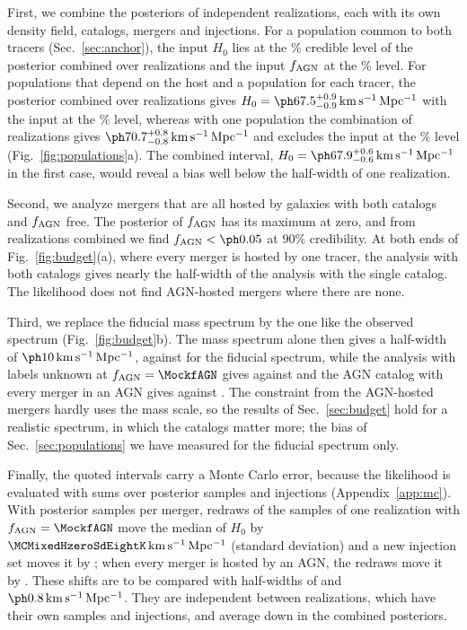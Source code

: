 \documentclass[aps,prd,reprint,amsmath,amssymb,nofootinbib]{revtex4-2}
\newcommand{\kmsMpc}{\,{\rm km\,s^{-1}\,Mpc^{-1}}}
\newcommand{\fAGN}{f_{\rm AGN}}
\begin{document}
First, we combine the posteriors of independent realizations, each with its own density field, catalogs, mergers and injections.
For a population common to both tracers (Sec.~\ref{sec:anchor}), the input $H_0$ lies at the \IndRecHzeroCL\% credible level of the posterior combined over \NrealKnown{} realizations and the input $\fAGN$ at the \IndRecfAGNCL\% level. %
For populations that depend on the host and a population for each tracer, the posterior combined over \NrealHD{} realizations gives $H_0=\IndTwoPopHzeroComb\kmsMpc$ with the input at the \IndTwoPopCL\% level, whereas with one population the combination of \NrealHDSingle{} realizations gives $\IndOnePopHzeroComb\kmsMpc$ and excludes the input at the \IndOnePopCL\% level (Fig.~\ref{fig:populations}a). %
The combined interval, $H_0=\IndRecHzeroComb\kmsMpc$ in the first case, would reveal a bias well below the half-width of one realization. %

Second, we analyze mergers that are all hosted by galaxies with both catalogs and $\fAGN$ free.
The posterior of $\fAGN$ has its maximum at zero, and from \IndNreal{} realizations combined we find $\fAGN<\IndZerofAGNUL$ at 90\% credibility. %
At both ends of Fig.~\ref{fig:budget}(a), where every merger is hosted by one tracer, the analysis with both catalogs gives nearly the half-width of the analysis with the single catalog. %
The likelihood does not find AGN-hosted mergers where there are none. %

Third, we replace the fiducial mass spectrum by the one like the observed spectrum (Fig.~\ref{fig:budget}b).
The mass spectrum alone then gives a half-width of $\IndObsHWSpec\kmsMpc$, against \IndHWSpec{} for the fiducial spectrum, while the analysis with labels unknown at $\fAGN=\MockfAGN$ gives \IndObsHWMix{} against \IndHWMix{} and the AGN catalog with every merger in an AGN gives \IndObsHWAGN{} against \IndHWAGN. %
The constraint from the AGN-hosted mergers hardly uses the mass scale, so the results of Sec.~\ref{sec:budget} hold for a realistic spectrum, in which the catalogs matter more; the bias of Sec.~\ref{sec:populations} we have measured for the fiducial spectrum only. %

Finally, the quoted intervals carry a Monte Carlo error, because the likelihood is evaluated with sums over posterior samples and injections (Appendix~\ref{app:mc}).
With \ProdNsamp{} posterior samples per merger, \MCMixedNEightK{} redraws of the samples of one realization with $\fAGN=\MockfAGN$ move the median of $H_0$ by $\MCMixedHzeroSdEightK\kmsMpc$ (standard deviation) and a new injection set moves it by \MCMixedInjHzeroSd; when every merger is hosted by an AGN, the redraws move it by \MCAGNHzeroSdEightK.
These shifts are to be compared with half-widths of \IndHWMix{} and $\IndHWAGN\kmsMpc$. %
They are independent between realizations, which have their own samples and injections, and average down in the combined posteriors.
\end{document}
